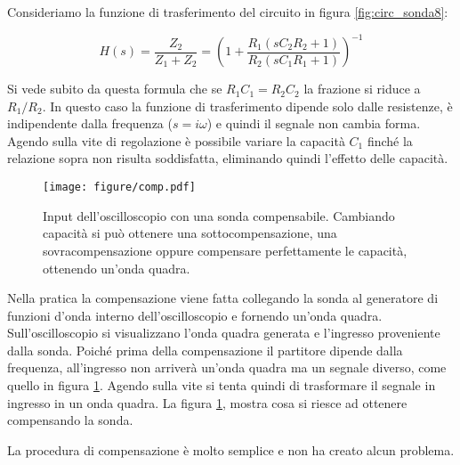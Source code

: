 Consideriamo la funzione di trasferimento del circuito in figura \ref{fig:circ_sonda8}:

\begin{equation}
    H(s) = \frac{Z_2}{Z_1 + Z_2} = \left(1 + \frac{R_1(sC_2R_2 + 1)}{R_2(sC_1R_1 + 1)}\right)^{-1}
\end{equation}

Si vede subito da questa formula che se $R_1C_1 = R_2C_2$ la frazione si riduce a $R_1/R_2$.
In questo caso la funzione di trasferimento dipende solo dalle resistenze, è indipendente dalla frequenza ($s = i\omega$)
e quindi il segnale non cambia forma. Agendo sulla vite di regolazione è possibile variare la capacità $C_1$
finché la relazione sopra non risulta soddisfatta, eliminando quindi l'effetto delle capacità.

\begin{figure}[t!]
    \centering
    \texttt{[image: figure/comp.pdf]}
    \caption{Input dell'oscilloscopio con una sonda compensabile. Cambiando capacità
        si può ottenere una sottocompensazione, una sovracompensazione oppure compensare perfettamente
        le capacità, ottenendo un'onda quadra.}
    \label{fig:compensazione8}
\end{figure}

Nella pratica la compensazione viene fatta collegando la sonda al generatore di funzioni d'onda interno dell'oscilloscopio
e fornendo un'onda quadra. Sull'oscilloscopio si visualizzano l'onda quadra generata e l'ingresso proveniente dalla sonda.
Poiché prima della compensazione il partitore dipende dalla frequenza, all'ingresso non arriverà un'onda quadra ma un
segnale diverso, come quello in figura \ref{fig:compensazione8}. Agendo sulla vite si tenta quindi di trasformare il
segnale in ingresso in un onda quadra. La figura \ref{fig:compensazione8}, mostra cosa si riesce ad ottenere compensando
la sonda.

La procedura di compensazione è molto semplice e non ha creato alcun problema.

